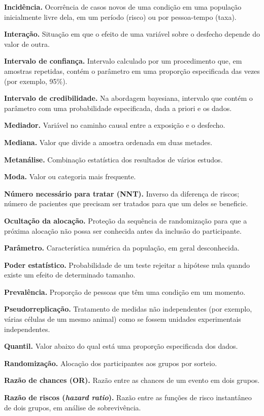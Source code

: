 \documentclass[
]{book}
\begin{document}
\textbf{Incidência.} Ocorrência de casos novos de uma condição em uma população inicialmente livre dela, em um período (risco) ou por pessoa-tempo (taxa).

\textbf{Interação.} Situação em que o efeito de uma variável sobre o desfecho depende do valor de outra.

\textbf{Intervalo de confiança.} Intervalo calculado por um procedimento que, em amostras repetidas, contém o parâmetro em uma proporção especificada das vezes (por exemplo, 95\%).

\textbf{Intervalo de credibilidade.} Na abordagem bayesiana, intervalo que contém o parâmetro com uma probabilidade especificada, dada a priori e os dados.

\textbf{Mediador.} Variável no caminho causal entre a exposição e o desfecho.

\textbf{Mediana.} Valor que divide a amostra ordenada em duas metades.

\textbf{Metanálise.} Combinação estatística dos resultados de vários estudos.

\textbf{Moda.} Valor ou categoria mais frequente.

\textbf{Número necessário para tratar (NNT).} Inverso da diferença de riscos; número de pacientes que precisam ser tratados para que um deles se beneficie.

\textbf{Ocultação da alocação.} Proteção da sequência de randomização para que a próxima alocação não possa ser conhecida antes da inclusão do participante.

\textbf{Parâmetro.} Característica numérica da população, em geral desconhecida.

\textbf{Poder estatístico.} Probabilidade de um teste rejeitar a hipótese nula quando existe um efeito de determinado tamanho.

\textbf{Prevalência.} Proporção de pessoas que têm uma condição em um momento.

\textbf{Pseudorreplicação.} Tratamento de medidas não independentes (por exemplo, várias células de um mesmo animal) como se fossem unidades experimentais independentes.

\textbf{Quantil.} Valor abaixo do qual está uma proporção especificada dos dados.

\textbf{Randomização.} Alocação dos participantes aos grupos por sorteio.

\textbf{Razão de chances (OR).} Razão entre as chances de um evento em dois grupos.

\textbf{Razão de riscos (\emph{hazard ratio}).} Razão entre as funções de risco instantâneo de dois grupos, em análise de sobrevivência.
\end{document}

